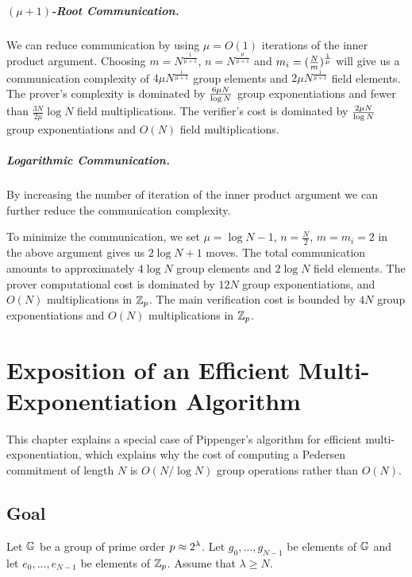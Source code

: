 \paragraph{$(\mu+1)$-Root Communication.} We can reduce communication by using $\mu=O(1)$ iterations of the inner product argument. Choosing $m=N^{\frac{1}{\mu+1}}$, $n=N^{\frac{\mu}{\mu+1}}$ and $m_i=({N \over m})^{\frac{1}{\mu}}$ will give us a communication complexity of $4\mu N^{\frac{1}{\mu+1}}$ group elements and $2\mu N^{\frac{1}{\mu+1}}$ field elements. The prover's complexity is dominated by $6\mu N \over \log{N}$ group exponentiations and fewer than $\frac{3N}{2\mu} \log N$ field multiplications. The verifier's cost is dominated by $2\mu N \over \log{N}$ group exponentiations and $O(N)$ field multiplications.


\paragraph{Logarithmic Communication.} By increasing the number of iteration of the inner product argument we can further reduce the communication complexity.

To minimize the communication, we set $\mu = \log N -1$, $n=\frac{N}{2}$, $m = m_i =2$ in the above argument gives us $2\log{N}+1$ moves.
The total communication amounts to approximately $4\log{N}$ group elements and $2\log{N}$ field elements.
The prover computational cost is dominated by $12N$ group exponentiations, and $O(N)$ multiplications in $\mathbb{Z}_p$.%
The main verification cost is bounded by $4N$ group exponentiations and $O(N)$ multiplications in $\mathbb{Z}_p$.

\chapter{Exposition of an Efficient Multi-Exponentiation Algorithm}
\label{appendix:multiexp}

This chapter explains a special case of Pippenger's algorithm \cite{Pippenger1980a} for efficient multi-exponentiation, which explains why the cost of computing a Pedersen commitment of length $N$ is $O(N / \log N)$ group operations rather than $O(N)$.

\section{Goal}

Let $\mathbb{G}$ be a group of prime order $p \approx 2^{\lambda}$. Let $g_0,\ldots,g_{N-1}$ be elements of $\mathbb{G}$ and let $e_0,\ldots,e_{N-1}$ be elements of $\mathbb{Z}_p$. Assume that $\lambda \geq N$.


